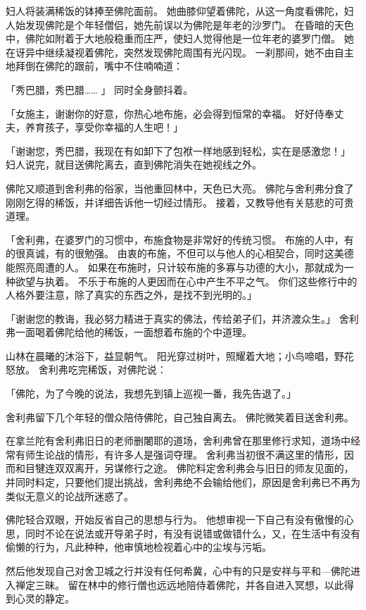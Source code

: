 \documentclass[twoside,openany]{book}
\begin{document}
妇人将装满稀饭的钵捧至佛陀面前。
她曲膝仰望着佛陀，从这一角度看佛陀，妇人始发现佛陀是个年轻僧侣，她先前误以为佛陀是年老的沙罗门。
在昏暗的天色中，佛陀如附着于大地般稳重而庄严，使妇人觉得他是一位年老的婆罗门僧。
她在讶异中继续凝视着佛陀，突然发现佛陀周围有光闪现。
一刹那间，她不由自主地拜倒在佛陀的跟前，嘴中不住喃喃道：

「秀巴腊，秀巴腊……	」
同时全身颤抖着。

「女施主，谢谢你的好意，你热心地布施，必会得到恒常的幸福。
好好侍奉丈夫，养育孩子，享受你幸福的人生吧！」

「谢谢您，秀巴腊，我现在有如卸下了包袱一样地感到轻松，实在是感激您！」
妇人说完，就目送佛陀离去，直到佛陀消失在她视线之外。

佛陀又顺道到舍利弗的俗家，当他重回林中，天色已大亮。
佛陀与舍利弗分食了刚刚乞得的稀饭，并详细告诉他一切经过情形。
接着，又教导他有关慈悲的可贵道理。

「舍利弗，在婆罗门的习惯中，布施食物是非常好的传统习惯。
布施的人中，有的很真诚，有的很勉强。
由衷的布施，不但可以与他人的心相契合，同时这美德能照亮周遭的人。
如果在布施时，只计较布施的多寡与功德的大小，那就成为一种欲望与执着。
不乐于布施的人更因而在心中产生不平之气。
你们这些修行中的人格外要注意，除了真实的东西之外，是找不到光明的。」

「谢谢您的教诲，我必努力精进于真实的佛法，传给弟子们，并济渡众生。」
舍利弗一面喝着佛陀给他的稀饭，一面想着布施的个中道理。

山林在晨曦的沐浴下，益显朝气。
阳光穿过树叶，照耀着大地；小鸟啼唱，野花怒放。
舍利弗吃完稀饭，对佛陀说：

「佛陀，为了今晚的说法，我想先到镇上巡视一番，我先告退了。」

舍利弗留下几个年轻的僧众陪侍佛陀，自己独自离去。
佛陀微笑着目送舍利弗。

在拿兰陀有舍利弗旧日的老师删闍耶的道场，舍利弗曾在那里修行求知，道场中经常有师生论战的情形，有许多人是强词夺理。
舍利弗当初很不满这里的情形，因而和目犍连双双离开，另谋修行之途。
佛陀料定舍利弗会与旧日的师友见面的，并同时料定，只要他们提出挑战，舍利弗绝不会输给他们，原因是舍利弗已不再为类似无意义的论战所迷惑了。

佛陀轻合双眼，开始反省自己的思想与行为。
他想审视一下自己有没有傲慢的心思，同时不论在说法或开导弟子时，有没有说错或做错什么，又，在生活中有没有偷懒的行为，凡此种种，他审慎地检视着心中的尘埃与污垢。

然后他发现自己对舍卫城之行并没有任何希冀，心中有的只是安祥与平和---佛陀进入禅定三昧。
留在林中的修行僧也远远地陪侍着佛陀，并各自进入冥想，以此得到心灵的静定。
\end{document}
